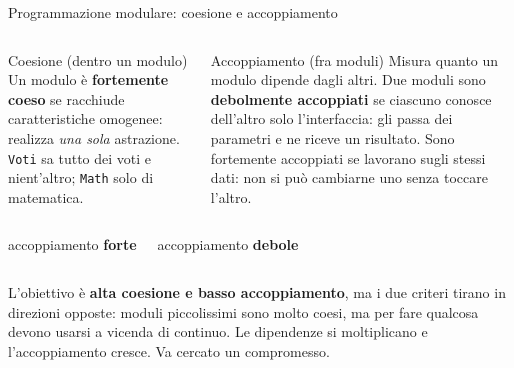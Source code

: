 \documentclass[10pt,aspectratio=169]{beamer}
\begin{document}
\begin{frame}[fragile]{Programmazione modulare: coesione e accoppiamento}
\begin{columns}[T]
\begin{block}{Coesione (dentro un modulo)}
\small Un modulo è \textbf{fortemente coeso} se racchiude caratteristiche omogenee: realizza \emph{una sola} astrazione. \texttt{Voti} sa tutto dei voti e nient'altro; \texttt{Math} solo di matematica.
\end{block}
\begin{block}{Accoppiamento (fra moduli)}
\small Misura quanto un modulo dipende dagli altri. Due moduli sono \textbf{debolmente accoppiati} se ciascuno conosce dell'altro solo l'interfaccia: gli passa dei parametri e ne riceve un risultato. Sono fortemente accoppiati se lavorano sugli stessi dati: non si può cambiarne uno senza toccare l'altro.
\end{block}
\end{columns}

\vspace{0.2cm}
\begin{columns}[T]
\centering\small accoppiamento \textbf{forte}
\centering\small accoppiamento \textbf{debole}
\end{columns}

\vspace{0.15cm}
\small L'obiettivo è \textbf{alta coesione e basso accoppiamento}, ma i due criteri tirano in direzioni opposte: moduli piccolissimi sono molto coesi, ma per fare qualcosa devono usarsi a vicenda di continuo. Le dipendenze si moltiplicano e l'accoppiamento cresce. Va cercato un compromesso.
\end{frame}
\end{document}
